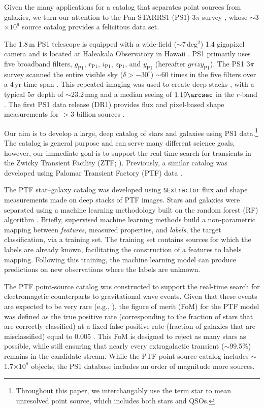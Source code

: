 \documentclass[twocolumn, dvipdfmx]{aastex62}
\begin{document}
Given the many applications for a catalog that separates point sources from
galaxies, we turn our attention to the Pan-STARRS1 (PS1) 3$\pi$ survey
\citep{Chambers16}, whose $\sim$3$\times 10^{9}$ source catalog provides a
felicitous data set.

The 1.8\,m PS1 telescope is equipped with a wide-field ($\sim$7\,deg$^2$)
1.4 gigapixel camera and is located at Haleakala Observatory in Hawaii
\citep{Hodapp04}. PS1 primarily uses five broadband filters,
$g_{\mathrm{P1}}$, $r_{\mathrm{P1}}$, $i_{\mathrm{P1}}$, $z_{\mathrm{P1}}$,
and $y_{\mathrm{P1}}$ (hereafter $grizy_{\mathrm{P1}}$). The PS1 3$\pi$
survey scanned the entire visible sky ($\delta > -30^\circ$) $\sim$60 times
in the five filters over a 4\,yr time span \citep{Chambers16}. This
repeated imaging was used to create deep stacks \citep{Magnier16b}, with a
typical 5$\sigma$ depth of $\sim$23.2\,mag and a median seeing of
$1.19\arcsec$ in the $r$-band \citep{Tonry12, Schlafly12, Chambers16}. The
first PS1 data release (DR1) provides flux and pixel-based shape
measurements for $>$3 billion sources \citep{Flewelling16}.

Our aim is to develop a large, deep catalog of stars and galaxies using PS1
data.\footnote{Throughout this paper, we interchangably use the term star to
mean unresolved point source, which includes both stars and QSOs.} The
catalog is general purpose and can serve many different science goals,
however, our immediate goal is to support the real-time search for
transients in the Zwicky Transient Facility (ZTF; \citealt{Bellm:18:ZTF}).
Previously, a similar catalog was developed using Palomar Transient Factory
(PTF) data \citep{Miller17}.

The PTF star--galaxy catalog was developed using \texttt{SExtractor}
\citep{bertin96} flux and shape measurements made on deep stacks of PTF
images. Stars and galaxies were separated using a machine learning
methodology built on the random forest (RF) algorithm \citep{Breiman01}.
Briefly, supervised machine learning methods build a non-parametric mapping
between \textit{features}, measured properties, and \textit{labels}, the
target classification, via a training set. The training set contains sources
for which the labels are already known, facilitating the construction of a
features to labels mapping. Following this training, the machine learning
model can produce predictions on new observations where the labels are
unknown.

The PTF point-source catalog was constructed to support the real-time search
for electromagetic counterparts to gravitational wave events. Given that
these events are expected to be very rare (e.g., \citealt{Scolnic18}), the
figure of merit (FoM) for the PTF model was defined as the true positive
rate (corresponding to the fraction of stars that are correctly classified)
at a fixed false positive rate (fraction of galaxies that are misclassified)
equal to 0.005 \citep{Miller17}. This FoM is designed to reject as many
stars as possible, while still ensuring that nearly every extragalactic
transient ($\sim$99.5\%) remains in the candidate stream. While the PTF
point-source catalog includes $\sim$1.7$\times 10^8$ objects, the PS1
database includes an order of magnitude more sources.
\end{document}

